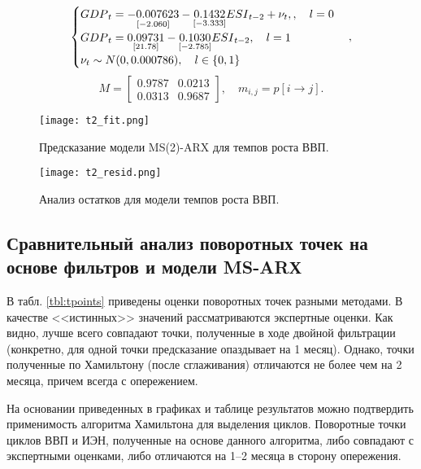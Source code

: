 \documentclass[a4paper,14pt]{extreport}
\begin{document}
	
	{
		\begin{equation}
		\label{eq:ms2varx}
		\begin{cases}
		{GDP}_{t} = 
		\underset{[-2.060]}{-0.007623} 
		- \underset{[-3.333]}{0.1432} {ESI}_{t-2}
		+ \nu_{t} , \space 
		, \quad l=0 \\
		{GDP}_{t} = 
		\underset{[21.78]}{0.09731}
		- \underset{[-2.785]}{0.1030} {ESI}_{t-2}
		, \quad l=1 \\
		\nu_{t} \sim N(0, 0.000786) , \quad l \in \{0, 1\}
		\end{cases},
		\end{equation}
		\begin{equation}
		\label{eq:ms2varx_m}
		M = 
		\begin{bmatrix}
		0.9787 & 0.0213 \\
		0.0313 & 0.9687
		\end{bmatrix}
		, \quad m_{i,j} = p[i \rightarrow j]
		.
		\end{equation}		
	}
	
	{
		\begin{figure}
			\texttt{[image: t2\_fit.png]}
			\caption{Предсказание модели MS(2)-ARX для темпов роста ВВП.}
			\label{fig:hp-fitcompare2}
		\end{figure}
		\begin{figure}
			\texttt{[image: t2\_resid.png]}
			\caption{Анализ остатков для модели темпов роста ВВП.}
			\label{fig:hp-residcompare2}
		\end{figure}
	}
	
	\subsection{Сравнительный анализ поворотных точек на основе фильтров и модели MS-ARХ}
	
	
	В табл. \ref{tbl:tpoints} приведены оценки поворотных точек разными методами. В качестве <<истинных>> значений рассматриваются экспертные оценки. Как видно, лучше всего совпадают точки, полученные в ходе двойной фильтрации (конкретно, для одной точки предсказание опаздывает на 1 месяц). Однако, точки полученные по Хамильтону (после сглаживания) отличаются не более чем на 2 месяца, причем всегда с опережением.
	
	На основании приведенных в графиках и таблице результатов можно подтвердить применимость алгоритма Хамильтона для выделения циклов. Поворотные точки циклов ВВП и ИЭН, полученные на основе данного алгоритма, либо совпадают с экспертными оценками, либо отличаются на 1–2 месяца в сторону опережения.
	
\end{document}
